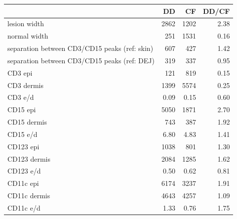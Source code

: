 \begin{tabular}{lrrr}
   \hline  &DD& CF& DD/CF\\ 
\hline
lesion width & 2862 & 1202 & 2.38 \\ 
  normal width & 251 & 1531 & 0.16 \\ 
  separation between CD3/CD15 peaks (ref: skin) & 607 & 427 & 1.42 \\ 
  separation between CD3/CD15 peaks (ref: DEJ) & 319 & 337 & 0.95 \\ 
   \hline
CD3 epi & 121 & 819 & 0.15 \\ 
  CD3 dermis & 1399 & 5574 & 0.25 \\ 
  CD3 e/d & 0.09 & 0.15 & 0.60 \\ 
   \hline
CD15 epi & 5050 & 1871 & 2.70 \\ 
  CD15 dermis & 743 & 387 & 1.92 \\ 
  CD15 e/d & 6.80 & 4.83 & 1.41 \\ 
   \hline
CD123 epi & 1038 & 801 & 1.30 \\ 
  CD123 dermis & 2084 & 1285 & 1.62 \\ 
  CD123 e/d & 0.50 & 0.62 & 0.81 \\ 
   \hline
CD11c epi & 6174 & 3237 & 1.91 \\ 
  CD11c dermis & 4643 & 4257 & 1.09 \\ 
  CD11c e/d & 1.33 & 0.76 & 1.75 \\ 
   \hline
\end{tabular}
